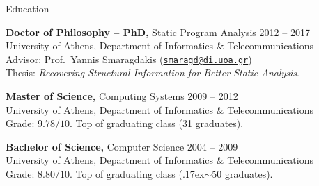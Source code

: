 \documentclass{resume}
\begin{document}
\newcommand{\mytilde}{\raise.17ex\hbox{$\scriptstyle\mathtt{\sim}$}}



\begin{rSection}{Education}

{\bf Doctor of Philosophy -- PhD,} Static Program Analysis \hfill {2012 -- 2017} \\
University of Athens, Department of Informatics \& Telecommunications \\
Advisor: Prof.~Yannis Smaragdakis
(\href{mailto:smaragd@di.uoa.gr}{\nolinkurl{smaragd@di.uoa.gr}}) \\
Thesis: \emph{Recovering Structural Information for Better Static Analysis}.

{\bf Master of Science,} Computing Systems \hfill {2009 -- 2012} \\
University of Athens, Department of Informatics \& Telecommunications \\
Grade: $9.78 / 10$. Top of graduating class (31 graduates).

{\bf Bachelor of Science,} Computer Science \hfill {2004 -- 2009}  \\
University of Athens, Department of Informatics \& Telecommunications \\
Grade: $8.80 / 10$. Top of graduating class (\mytilde{}50 graduates).

\end{rSection}

\end{document}
